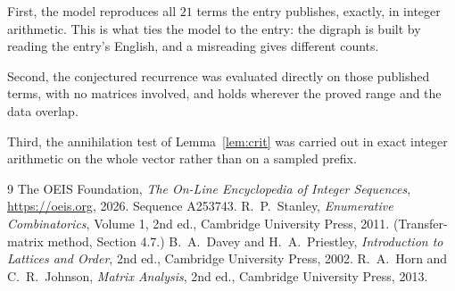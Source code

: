 \documentclass[11pt,a4paper]{article}
\theoremstyle{plain}
\theoremstyle{definition}
\begin{document}
First, the model reproduces all $21$ terms the entry publishes, exactly, in integer
arithmetic. This is what ties the model to the entry: the digraph is built by reading the
entry's English, and a misreading gives different counts.

Second, the conjectured recurrence was evaluated directly on those published terms, with no
matrices involved, and holds wherever the proved range and the data overlap.

Third, the annihilation test of Lemma~\ref{lem:crit} was carried out in exact integer
arithmetic on the whole vector rather than on a sampled prefix.

\begin{thebibliography}{9}
 The OEIS Foundation, \emph{The On-Line Encyclopedia of Integer
Sequences}, \url{https://oeis.org}, 2026. Sequence A253743.
 R.~P.~Stanley, \emph{Enumerative Combinatorics}, Volume 1, 2nd ed.,
Cambridge University Press, 2011. (Transfer-matrix method, Section 4.7.)
 B.~A.~Davey and H.~A.~Priestley, \emph{Introduction to Lattices and
Order}, 2nd ed., Cambridge University Press, 2002.
 R.~A.~Horn and C.~R.~Johnson, \emph{Matrix Analysis}, 2nd ed., Cambridge
University Press, 2013.
\end{thebibliography}
\end{document}

